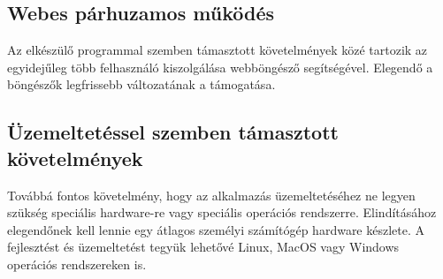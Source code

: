 \subsection{Webes párhuzamos működés}

Az elkészülő programmal szemben támasztott követelmények közé tartozik az egyidejűleg több felhasználó kiszolgálása webböngésző segítségével.
Elegendő a böngészők legfrissebb változatának a támogatása.

\subsection{Üzemeltetéssel szemben támasztott követelmények}
Továbbá fontos követelmény, hogy az alkalmazás üzemeltetéséhez ne legyen szükség speciális hardware-re vagy speciális operációs rendszerre. 
Elindításához elegendőnek kell lennie egy átlagos személyi számítógép hardware készlete. 
A fejlesztést és üzemeltetést tegyük lehetővé Linux, MacOS vagy Windows operációs rendszereken is. 
